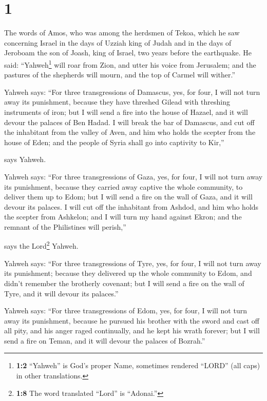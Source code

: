 \hypertarget{section}{%
\section{1}\label{section}}

 The words of Amos, who was among the herdsmen of Tekoa,
which he saw concerning Israel in the days of Uzziah king of Judah and
in the days of Jeroboam the son of Joash, king of Israel, two years
before the earthquake.  He said: ``Yahweh\footnote{\textbf{1:2}
  ``Yahweh'' is God's proper Name, sometimes rendered ``LORD'' (all
  caps) in other translations.} will roar from Zion, and utter his voice
from Jerusalem; and the pastures of the shepherds will mourn, and the
top of Carmel will wither.''

 Yahweh says: ``For three transgressions of Damascus, yes,
for four, I will not turn away its punishment, because they have
threshed Gilead with threshing instruments of iron;  but I
will send a fire into the house of Hazael, and it will devour the
palaces of Ben Hadad.  I will break the bar of Damascus,
and cut off the inhabitant from the valley of Aven, and him who holds
the scepter from the house of Eden; and the people of Syria shall go
into captivity to Kir,''

says Yahweh.

 Yahweh says: ``For three transgressions of Gaza, yes, for
four, I will not turn away its punishment, because they carried away
captive the whole community, to deliver them up to Edom; 
but I will send a fire on the wall of Gaza, and it will devour its
palaces.  I will cut off the inhabitant from Ashdod, and
him who holds the scepter from Ashkelon; and I will turn my hand against
Ekron; and the remnant of the Philistines will perish,''

says the Lord\footnote{\textbf{1:8} The word translated ``Lord'' is
  ``Adonai.''} Yahweh.

 Yahweh says: ``For three transgressions of Tyre, yes, for
four, I will not turn away its punishment; because they delivered up the
whole community to Edom, and didn't remember the brotherly covenant;
 but I will send a fire on the wall of Tyre, and it will
devour its palaces.''

 Yahweh says: ``For three transgressions of Edom, yes,
for four, I will not turn away its punishment, because he pursued his
brother with the sword and cast off all pity, and his anger raged
continually, and he kept his wrath forever;  but I will
send a fire on Teman, and it will devour the palaces of Bozrah.''

